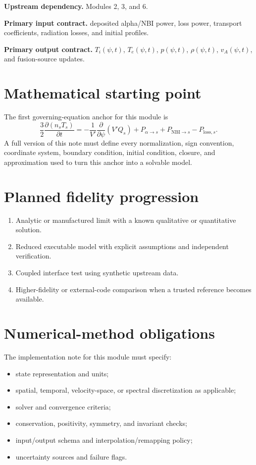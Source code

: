 \documentclass[11pt]{article}
\begin{document}
\textbf{Upstream dependency.} Modules 2, 3, and 6.

\textbf{Primary input contract.} deposited alpha/NBI power, loss power, transport coefficients, radiation losses, and initial profiles.

\textbf{Primary output contract.} $T_i(\psi,t)$, $T_e(\psi,t)$, $p(\psi,t)$, $\rho(\psi,t)$, $v_A(\psi,t)$, and fusion-source updates.

\section{Mathematical starting point}
The first governing-equation anchor for this module is
\begin{equation}
\frac{3}{2}\frac{\partial(n_sT_s)}{\partial t}=-\frac{1}{V\prime}\frac{\partial}{\partial\psi}\left(V\prime Q_s\right)+P_{\alpha\rightarrow s}+P_{\mathrm{NBI}\rightarrow s}-P_{\mathrm{loss},s}.
\end{equation}
A full version of this note must define every normalization, sign convention, coordinate system, boundary condition, initial condition, closure, and approximation used to turn this anchor into a solvable model.

\section{Planned fidelity progression}
\begin{enumerate}[leftmargin=1.6em]
\item Analytic or manufactured limit with a known qualitative or quantitative solution.
\item Reduced executable model with explicit assumptions and independent verification.
\item Coupled interface test using synthetic upstream data.
\item Higher-fidelity or external-code comparison when a trusted reference becomes available.
\end{enumerate}

\section{Numerical-method obligations}
The implementation note for this module must specify:
\begin{itemize}[leftmargin=1.6em]
\item state representation and units;
\item spatial, temporal, velocity-space, or spectral discretization as applicable;
\item solver and convergence criteria;
\item conservation, positivity, symmetry, and invariant checks;
\item input/output schema and interpolation/remapping policy;
\item uncertainty sources and failure flags.
\end{itemize}
\end{document}
